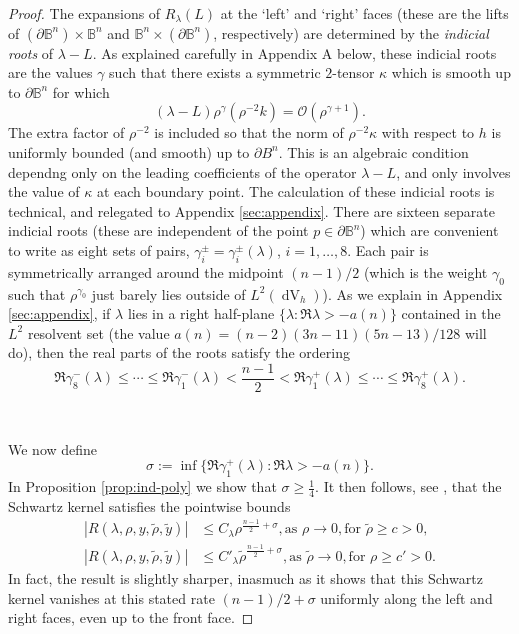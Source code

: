\documentclass[10pt,reqno]{amsart}
\DeclareMathOperator{\dvol}{dV}
\begin{document}
\begin{proof}
The expansions of $R_\lambda(L)$ at the `left' and `right' faces (these are the lifts of $(\partial \mathbb{B}^n) \times \mathbb{B}^n$ and $\mathbb{B}^n \times (\partial \mathbb{B}^n)$, 
respectively) are determined by the {\it indicial roots} of $\lambda - L$. As explained carefully in Appendix A below, these indicial roots are the values $\gamma$ such that there exists
a symmetric $2$-tensor $\kappa$ which is smooth up to $\partial \mathbb{B}^n$ for which
\[
(\lambda - L) \rho^{\gamma} ( \rho^{-2}k) = \mathcal O( \rho^{\gamma+1}).
\]
The extra factor of $\rho^{-2}$ is included so that the norm of $\rho^{-2}\kappa$ with respect to $h$ is uniformly bounded (and smooth) up to $\partial B^n$.
This is an algebraic condition dependng only on the leading coefficients of the operator $\lambda - L$, and only involves the value of $\kappa$ at each 
boundary point. 
The calculation of these indicial roots is technical, and relegated to Appendix \ref{sec:appendix}.   There are sixteen separate indicial roots (these are independent of the point 
$p \in \partial \mathbb{B}^n$) which are convenient to write as eight sets of pairs, $\gamma_i^{\pm} = \gamma_i^{\pm}(\lambda)$, $i = 1, \ldots,  8$.  Each pair 
is symmetrically arranged around the midpoint $(n-1)/2$ (which is the weight $\gamma_0$ such that $\rho^{\gamma_0}$ just barely lies outside of $L^2(\dvol_h)$).   
As we explain in Appendix \ref{sec:appendix}, if $\lambda$ lies in a right half-plane $\{\lambda: \Re \lambda > -a(n)\}$ contained in the $L^2$ resolvent set (the value 
$a(n) = (n-2)(3n-11)(5n-13)/128$ will do), then the real parts of the roots satisfy the ordering
\[
\Re \gamma_8^-(\lambda) \leq \cdots  \leq  \Re \gamma_1^-(\lambda) <  \frac{n-1}{2} < \Re \gamma_1^+(\lambda) \leq \cdots \leq \Re \gamma_8^+(\lambda).
\]

\

We now define 
\[ 
\sigma := \inf \{\Re \gamma_1^+(\lambda): \Re \lambda > -a(n)\} . 
\]
In Proposition \ref{prop:ind-poly} we show that $\sigma \geq \frac{1}{4}.$   It then follows, see \cite{Ma-edge}, that the Schwartz kernel satisfies the pointwise bounds
\begin{align*}
|R(\lambda, \rho, y, \tilde{\rho}, \tilde{y})| &\leq C_{\lambda} \rho^{\frac{n-1}{2}+\sigma}, \mbox{as } \rho\to 0, \mbox{for }  \tilde{\rho} \geq c > 0, \\
|R(\lambda, \rho, y, \tilde{\rho}, \tilde{y})| &\leq C'_{\lambda} \tilde{\rho}^{\frac{n-1}{2}+\sigma}, \mbox{as } \tilde{\rho}\to 0,\mbox{for } \rho \geq c' > 0.
\end{align*}
In fact, the result is slightly sharper, inasmuch as it shows that this Schwartz kernel vanishes at this stated rate $(n-1)/2 + \sigma$ uniformly along the
left and right faces, even up to the front face. 


\end{proof}
\end{document}
